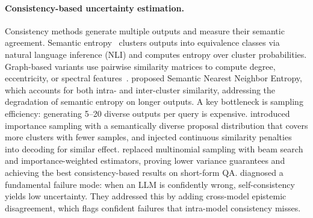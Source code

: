 \paragraph{Consistency-based uncertainty estimation.}
Consistency methods generate multiple outputs and measure their semantic agreement.
Semantic entropy~\citep{kuhn2023semantic} clusters outputs into equivalence classes via natural language inference (NLI) and computes entropy over cluster probabilities.
Graph-based variants use pairwise similarity matrices to compute degree, eccentricity, or spectral features~\citep{lin2024generating}.
\citet{nguyen2025snne} proposed Semantic Nearest Neighbor Entropy, which accounts for both intra- and inter-cluster similarity, addressing the degradation of semantic entropy on longer outputs.
A key bottleneck is sampling efficiency: generating 5--20 diverse outputs per query is expensive.
\citet{aichberger2025sdlg} introduced importance sampling with a semantically diverse proposal distribution that covers more clusters with fewer samples, and \citet{park2025diversity} injected continuous similarity penalties into decoding for similar effect.
\citet{fadeeva2026beams} replaced multinomial sampling with beam search and importance-weighted estimators, proving lower variance guarantees and achieving the best consistency-based results on short-form QA.
\citet{hamidieh2026crossmodel} diagnosed a fundamental failure mode: when an LLM is confidently wrong, self-consistency yields low uncertainty.
They addressed this by adding cross-model epistemic disagreement, which flags confident failures that intra-model consistency misses.

